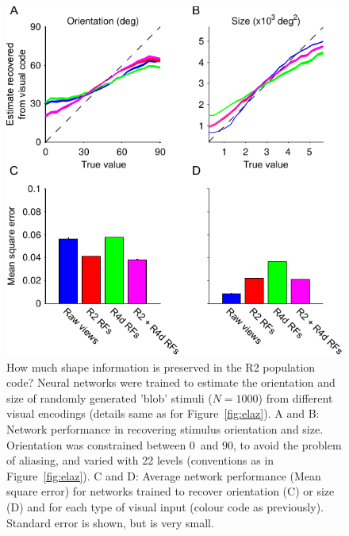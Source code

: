 \begin{figure}
\centering
\includegraphics{figures/orsi}
\caption{How much shape information is preserved in the R2 population code?
Neural networks were trained to estimate the orientation and size of randomly generated 'blob' stimuli ($N=1000$) from different visual encodings (details same as for Figure~\ref{fig:elaz}).
A and B: Network performance in recovering stimulus orientation and size. Orientation was constrained between 0\degree\ and 90\degree, to avoid the problem of aliasing, and varied with 22 levels (conventions as in Figure~\ref{fig:elaz}).
C and D: Average network performance (Mean square error) for networks trained to recover orientation (C) or size (D) and for each type of visual input (colour code as previously). Standard error is shown, but is very small.
}
\label{fig:orsi}
\end{figure}
